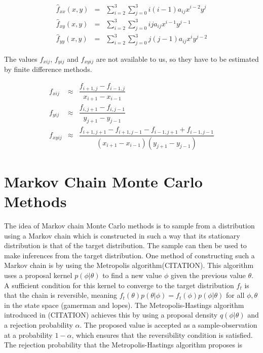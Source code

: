 $$
\begin{array}{rcl}
    \hat{f}_{xx}(x,y) & = & \sum_{i=2}^3 \sum_{j=0}^3 i (i-1) a_{ij}x^{i-2} y^j \\
    \hat{f}_{xy}(x,y) & = & \sum_{i=2}^3 \sum_{j=0}^3 i j a_{ij}x^{i-1} y^{j-1} \\
    \hat{f}_{yy}(x,y) & = & \sum_{i=2}^3 \sum_{j=0}^3 j (j-1) a_{ij}x^{i} y^{j-2}
\end{array}
$$

The values $f_{xij}$, $f_{yij}$ and $f_{xyij}$ are not available to us, so they have to be estimated by finite difference methods. 


$$
\begin{array}{rcl}
    f_{xij} & \approx & \dfrac{f_{i+1,j} - f_{i-1,j}}{x_{i+1} - x_{i-1}}  \\
    f_{yij} & \approx & \dfrac{f_{i,j+1} - f_{i,j-1}}{y_{j+1} - y_{j-1}} \\
    f_{xyij} & \approx & \dfrac{f_{i+1,j+1} - f_{i+1,j-1} - f_{i-1,j+1} + f_{i-1,j-1}}{(x_{i+1} - x_{i-1})(y_{j+1} - y_{j-1})}
\end{array}
$$


\parencite{choudhary_bicubic_2018}

\section{Markov Chain Monte Carlo Methods}


The idea of Markov chain Monte Carlo methods is to sample from a distribution using a Markov chain which is constructed in such a way that its stationary distribution is that of the target distribution. The sample can then be used to make inferences from the target distribution. One method of constructing such a Markov chain is by using the Metropolis algorithm(CITATION). This algorithm uses a proposal kernel $p(\phi | \theta)$ to find a new value $\phi$ given the previous value $\theta$. A sufficient condition for this kernel to converge to the target distribution $f_t$ is that the chain is reversible, meaning $f_t(\theta) p(\theta|\phi) = f_t(\phi) p(\phi|\theta)$ for all $\phi,\theta$ in the state space (gamerman and lopes). The Metropolis-Hastings algorithm introduced in (CITATION) achieves this by using a proposal density $q(\phi|\theta)$ and a rejection probability $\alpha$. The proposed value is accepted as a sample-observation at a probability $1-\alpha$, which ensures that the reversibility condition is satisfied. The rejection probability that the Metropolis-Hastings algorithm proposes is

